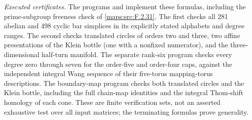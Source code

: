 \emph{Executed certificates.}
The programs  and
 implement these
formulas, including the prime-subgroup freeness check of \ref{maps:src:F.2.31}.
The first checks all 281 abelian and 498 cyclic bar simplices
in its explicitly stated alphabets and degree ranges.
The second checks translated circles of orders two and three,
two affine presentations of the Klein bottle (one with a
nonfixed numerator), and the three-dimensional half-turn
manifold.  The separate rank-six program checks every degree
zero through seven for the order-five and order-four caps,
against the independent integral Wang sequence of their
five-torus mapping-torus descriptions.
The boundary-map program checks both translated circles and
the Klein bottle, including the full chain-map identities and
the integral Thom-shift homology of each cone.  These are
finite verification sets, not an asserted exhaustive test over
all input matrices; the terminating formulas prove generality.







